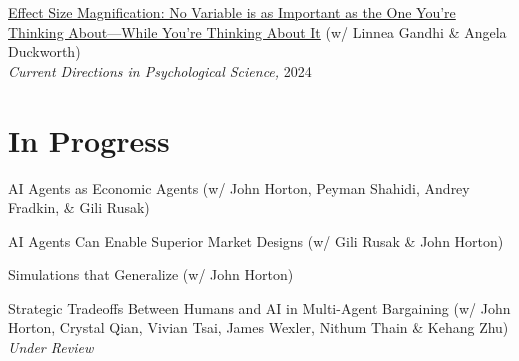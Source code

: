 \documentclass[margin,line,pifont,palatino,courier, 9pt]{res}
\begin{document}
\begin{resume}
\href{https://journals.sagepub.com/doi/full/10.1177/09637214241268222}{Effect Size Magnification: No Variable is as Important as the One You're Thinking About---While You're Thinking About It} (w/ Linnea Gandhi \& Angela Duckworth)\\
\textit{Current Directions in Psychological Science,} 2024

\section{\sc In Progress}
AI Agents as Economic Agents (w/ John Horton, Peyman Shahidi, Andrey Fradkin, \& Gili Rusak)

AI Agents Can Enable Superior Market Designs (w/ Gili Rusak \& John Horton)

Simulations that Generalize (w/ John Horton)

Strategic Tradeoffs Between Humans and AI in Multi-Agent Bargaining
(w/ John Horton, Crystal Qian, Vivian Tsai, James Wexler, Nithum Thain \& Kehang Zhu)\\
\textit{Under Review}



\end{resume}
\end{document}
